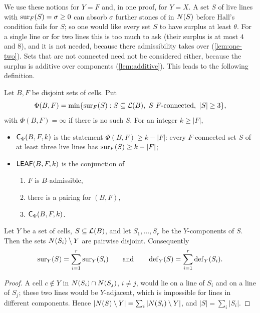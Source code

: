 We use these notions for $Y=F$ and, in one proof, for $Y=X$. A set $S$ of live lines with
$\operatorname{sur}_F(S)=\sigma\ge 0$ can absorb $\sigma$ further stones of \Maker{} in $N(S)$ before Hall's condition
fails for $S$; so one would like every set $S$ to have surplus at least $\theta$. For a single line or
for two lines this is too much to ask (their surplus is at most $4$ and $8$), and it is not needed,
because there admissibility takes over (\cref{lem:one-two}). Sets that are not connected need not be
considered either, because the surplus is additive over components (\cref{lem:additive}). This leads to
the following definition.

\begin{definition}\label{def:leaf}
Let $B,F$ be disjoint sets of cells. Put
\[
  \Phi(B,F)=\min\{\sur_F(S) : S\subseteq\live{B},\ S\ F\text{-connected},\ |S|\ge 3\},
\]
with $\Phi(B,F)=\infty$ if there is no such $S$. For an integer $k\ge|F|$,
\begin{itemize}
\item $\mathsf{C}_\Phi(B,F,k)$ is the statement $\Phi(B,F)\ge k-|F|$: every $F$-connected set $S$ of at least three
      live lines has $\operatorname{sur}_F(S)\ge k-|F|$;
\item $\mathsf{LEAF}(B,F,k)$ is the conjunction of
  \begin{enumerate}[label=\textup{(L\arabic*)}]
  \item $F$ is $B$-admissible,
  \item there is a pairing for $(B,F)$,
  \item $\mathsf{C}_\Phi(B,F,k)$.
  \end{enumerate}
\end{itemize}
\end{definition}

\begin{lemma}\label{lem:additive}
Let $Y$ be a set of cells, $S\subseteq\mathcal{L}(B)$, and let $S_1,\dots,S_r$ be the $Y$-components of $S$. Then
the sets $N(S_i)\setminus Y$ are pairwise disjoint. Consequently
\[
  \operatorname{sur}_Y(S)=\sum_{i=1}^r\operatorname{sur}_Y(S_i)\qquad\text{and}\qquad \operatorname{def}_Y(S)=\sum_{i=1}^r\operatorname{def}_Y(S_i).
\]
\end{lemma}

\begin{proof}
A cell $c\notin Y$ in $N(S_i)\cap N(S_j)$, $i\ne j$, would lie on a line of $S_i$ and on a line of $S_j$;
these two lines would be $Y$-adjacent, which is impossible for lines in different components. Hence
$|N(S)\setminus Y|=\sum_i|N(S_i)\setminus Y|$, and $|S|=\sum_i|S_i|$.
\end{proof}

